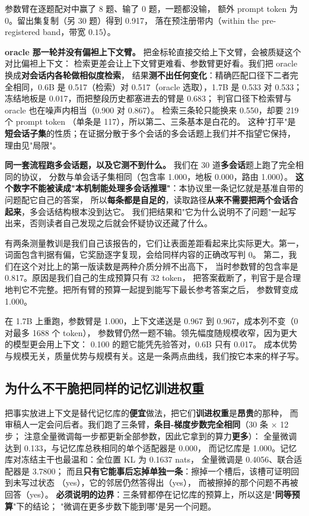 \documentclass[11pt]{ctexart}
\begin{document}
参数臂在逐题配对中赢了 8 题、输了 0 题，一题都没输，
额外 prompt token 为 0。留出集复制（另 30 题）得到 0.917，
落在预注册带内（within the pre-registered band，带宽 $0.15$）。

\textbf{oracle 那一轮并没有偏袒上下文臂。} 把金标轮直接交给上下文臂，会被质疑这个对比偏袒上下文：
检索更差会让上下文臂更难看、参数臂更好看。我们把 oracle 换成\textbf{对会话内各轮做相似度检索}，
结果\textbf{测不出任何变化}：精确匹配口径下二者完全相同，0.6B 是 0.517（检索）对
0.517（oracle 选取），1.7B 是 0.533 对 0.533；
冻结地板是 0.017，而把整段历史都塞进去的臂是 0.683；
判官口径下检索臂与 oracle 也在噪声内相当（0.900 对 0.867）。
检索三条轮只能换来 0.550，却要 219 个 prompt token
（单条是 117），所以第二、三条基本是白花的。
这种"打平"是\textbf{短会话子集}的性质；在证据分散于多个会话的多会话题上我们并不指望它保持，
理由见"局限"。

\textbf{同一套流程跑多会话题，以及它测不到什么。} 我们在 30 道\textbf{多会话}题上跑了完全相同的协议，
分数与单会话子集相同（包含率 1.000，地板 0.000，路由 1.000）。
\textbf{这个数字不能被读成"本机制能处理多会话推理"}：本协议里一条记忆就是基准自带的问题配它自己的答案，
所以\textbf{每条都是自足的}，读取路径\textbf{从来不需要把两个会话合起来}，多会话结构根本没到达它。
我们把结果和"它为什么说明不了问题"一起写出来，否则读者自己发现之后就会怀疑协议还藏了什么。

有两条测量教训是我们自己该报告的，它们让表面差距看起来比实际更大。第一，
词面包含判据有偏，它奖励逐字复现，会给同样内容的正确改写判 0。
第二，我们在这个对比上的第一版读数是两种介质分辨不出高下，
当时参数臂的包含率是 0.817。原因是我们自己的生成预算只有 32 token，
把答案截断了，判官于是合理地判它不完整。把所有臂的预算一起提到能写下最长参考答案之后，
参数臂变成 1.000。

在 1.7B 上重跑，参数臂是 1.000，上下文递送是 0.967
到 0.967，成本列不变（0 对最多 1688 个 token），
参数臂仍然一题不输。领先幅度随规模收窄，因为更大的模型更会用上下文：
0.100 的题它能凭先验答对，0.6B 只有 0.017。
成本优势与规模无关，质量优势与规模有关。这是一条两点曲线，我们按它本来的样子写。

\subsection{为什么不干脆把同样的记忆训进权重}
把事实放进上下文是替代记忆库的\textbf{便宜}做法，把它们\textbf{训进权重}是\textbf{昂贵}的那种，
而审稿人一定会问后者。我们跑了三条臂，\textbf{条目-梯度步数完全相同}（30 条 × 12 步；
注意全量微调每一步都更新全部参数，因此它拿到的算力\textbf{更多}）：
全量微调达到 0.133，与记忆库总秩相同的单个适配器是 0.000，
而记忆库是 1.000。记忆库对冻结主干也最温和：全位置 KL 为 0.1637 nats，
全量微调是 0.4056、联合适配器是 3.7800；
而且\textbf{只有它能事后忘掉单独一条}：擦掉一个槽后，该槽可证明回到未写过状态
（yes），它的邻居仍然答得出（yes），
而被擦掉的那个问题不再被回答（yes）。
\textbf{必须说明的边界}：三条臂都停在记忆库的预算上，所以这是"\textbf{同等预算}"下的结论；
"微调在更多步数下能到哪"是另一个问题。
\end{document}
